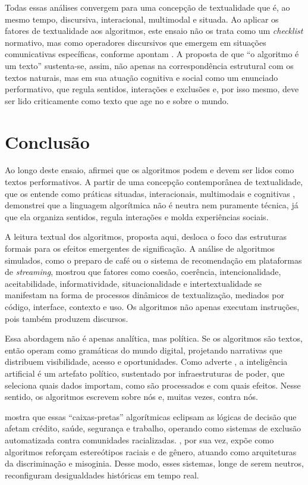 \documentclass[portuguese]{textolivre}
\begin{document}
Todas essas análises convergem para uma concepção de textualidade que é, ao mesmo tempo, discursiva, interacional, multimodal e situada. Ao aplicar os fatores de textualidade aos algoritmos, este ensaio não os trata como um \textit{checklist} normativo, mas como operadores discursivos que emergem em situações comunicativas específicas, conforme apontam \textcite{koch2006,marcuschi2008}. A proposta de que “o algoritmo é um texto” sustenta-se, assim, não apenas na correspondência estrutural com os textos naturais, mas em sua atuação cognitiva e social como um enunciado performativo, que regula sentidos, interações e exclusões e, por isso mesmo, deve ser lido criticamente como texto que age no e sobre o mundo.

\section{Conclusão}\label{sec-secoes}
Ao longo deste ensaio, afirmei que os algoritmos podem e devem ser lidos como textos performativos. A partir de uma concepção contemporânea de textualidade, que os entende como práticas situadas, interacionais, multimodais e cognitivas \cite{koch2006,marcuschi2008,beaugrande1997}, demonstrei que a linguagem algorítmica não é neutra nem puramente técnica, já que ela organiza sentidos, regula interações e molda experiências sociais.

A leitura textual dos algoritmos, proposta aqui, desloca o foco das estruturas formais para os efeitos emergentes de significação. A análise de algoritmos simulados, como o preparo de café ou o sistema de recomendação em plataformas de \textit{streaming}, mostrou que fatores como coesão, coerência, intencionalidade, aceitabilidade, informatividade, situacionalidade e intertextualidade se manifestam na forma de processos dinâmicos de textualização, mediados por código, interface, contexto e uso. Os algoritmos não apenas executam instruções, pois também produzem discursos.

Essa abordagem não é apenas analítica, mas política. Se os algoritmos são textos, então operam como gramáticas do mundo digital, projetando narrativas que distribuem visibilidade, acesso e oportunidades. Como adverte \textcite{crawford2021atlas}, a inteligência artificial é um artefato político, sustentado por infraestruturas de poder, que seleciona quais dados importam, como são processados e com quais efeitos. Nesse sentido, os algoritmos escrevem sobre nós e, muitas vezes, contra nós.

\textcite{pasquale2015black} mostra que essas “caixas-pretas” algorítmicas eclipsam as lógicas de decisão que afetam crédito, saúde, segurança e trabalho, operando como sistemas de exclusão automatizada contra comunidades racializadas. \textcite{noble2021}, por sua vez, expõe como algoritmos reforçam estereótipos raciais e de gênero, atuando como arquiteturas da discriminação e misoginia. Desse modo, esses sistemas, longe de serem neutros, reconfiguram desigualdades históricas em tempo real.
\end{document}
